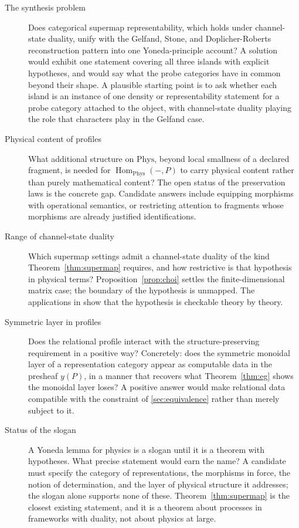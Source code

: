 \documentclass[11pt,letterpaper]{article}
\DeclareMathOperator{\Hom}{Hom}
\theoremstyle{definition}
\theoremstyle{remark}
\begin{document}
\begin{description}
\item[The synthesis problem] Does categorical supermap representability, which holds under channel-state duality, unify with the Gelfand, Stone, and Doplicher-Roberts reconstruction pattern into one Yoneda-principle account? A solution would exhibit one statement covering all three islands with explicit hypotheses, and would say what the probe categories have in common beyond their shape. A plausible starting point is to ask whether each island is an instance of one density or representability statement for a probe category attached to the object, with channel-state duality playing the role that characters play in the Gelfand case.

\item[Physical content of profiles] What additional structure on $\mathrm{Phys}$, beyond local smallness of a declared fragment, is needed for $\Hom_{\mathrm{Phys}}(-, P)$ to carry physical content rather than purely mathematical content? The open status of the preservation laws is the concrete gap. Candidate answers include equipping morphisms with operational semantics, or restricting attention to fragments whose morphisms are already justified identifications.

\item[Range of channel-state duality] Which supermap settings admit a channel-state duality of the kind Theorem~\ref{thm:supermap} requires, and how restrictive is that hypothesis in physical terms? Proposition~\ref{prop:choi} settles the finite-dimensional matrix case; the boundary of the hypothesis is unmapped. The applications in \cite{whh} show that the hypothesis is checkable theory by theory.

\item[Symmetric layer in profiles] Does the relational profile interact with the structure-preserving requirement in a positive way? Concretely: does the symmetric monoidal layer of a representation category appear as computable data in the presheaf $y(P)$, in a manner that recovers what Theorem~\ref{thm:eg} shows the monoidal layer loses? A positive answer would make relational data compatible with the constraint of \cref{sec:equivalence} rather than merely subject to it.

\item[Status of the slogan] A Yoneda lemma for physics is a slogan until it is a theorem with hypotheses. What precise statement would earn the name? A candidate must specify the category of representations, the morphisms in force, the notion of determination, and the layer of physical structure it addresses; the slogan alone supports none of these. Theorem~\ref{thm:supermap} is the closest existing statement, and it is a theorem about processes in frameworks with duality, not about physics at large.
\end{description}
\end{document}
